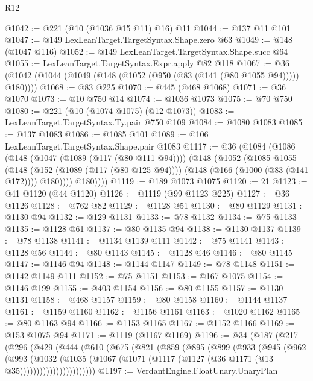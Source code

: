 \begin{lexlean}{R12}
\begin{coremodule}
@1042 := @221 (@10 (@1036 @15 @11) @16) @11
@1044 := @137 @11 @101
@1047 := @149 LexLeanTarget.TargetSyntax.Shape.zero @63
@1049 := @148 (@1047 @116)
@1052 := @149 LexLeanTarget.TargetSyntax.Shape.succ @64
@1055 := LexLeanTarget.TargetSyntax.Expr.apply @82 @118
@1067 := @36 (@1042 (@1044 (@1049 (@148 (@1052 (@950 (@83 (@141 (@80 @1055 @94))))) @180))))
@1068 := @83 @225
@1070 := @445 (@468 @1068)
@1071 := @36 @1070
@1073 := @10 @750 @14
@1074 := @1036 @1073
@1075 := @70 @750
@1080 := @221 (@10 (@1074 @1075) (@12 @1073))
@1083 := LexLeanTarget.TargetSyntax.Ty.pair @750 @109
@1084 := @1080 @1083
@1085 := @137 @1083
@1086 := @1085 @101
@1089 := @106 LexLeanTarget.TargetSyntax.Shape.pair @1083
@1117 := @36
    (@1084
      (@1086
        (@148
          (@1047 (@1089 (@117 (@80 @111 @94))))
          (@148
            (@1052
              (@1085
                @1055
                (@148
                  (@152 (@1089 (@117 (@80 @125 @94))))
                  (@148 (@166 (@1000 (@83 (@141 @172)))) @180))))
            @180))))
@1119 := @189 @1073 @1075
@1120 := 21
@1123 := @41 @1120 (@44 @1120)
@1126 := @1119 (@99 @1123 @225)
@1127 := @36 @1126
@1128 := @762 @82
@1129 := @1128 @51
@1130 := @80 @1129
@1131 := @1130 @94
@1132 := @129 @1131
@1133 := @78 @1132
@1134 := @75 @1133
@1135 := @1128 @61
@1137 := @80 @1135 @94
@1138 := @1130 @1137
@1139 := @78 @1138
@1141 := @1134 @1139 @111
@1142 := @75 @1141
@1143 := @1128 @56
@1144 := @80 @1143
@1145 := @1128 @46
@1146 := @80 @1145
@1147 := @1146 @94
@1148 := @1144 @1147
@1149 := @78 @1148
@1151 := @1142 @1149 @111
@1152 := @75 @1151
@1153 := @167 @1075
@1154 := @1146 @199
@1155 := @403 @1154
@1156 := @80 @1155
@1157 := @1130 @1131
@1158 := @468 @1157
@1159 := @80 @1158
@1160 := @1144 @1137
@1161 := @1159 @1160
@1162 := @1156 @1161
@1163 := @1020 @1162
@1165 := @80 @1163 @94
@1166 := @1153 @1165
@1167 := @1152 @1166
@1169 := @153 @1075 @94
@1171 := @1119 (@1167 @1169)
@1196 := @34
    (@187
      (@217
        (@296
          (@429
            (@444
              (@610
                (@675
                  (@821
                    (@859
                      (@895
                        (@899
                          (@933
                            (@945
                              (@962
                                (@993
                                  (@1032
                                    (@1035
                                      (@1067
                                        (@1071
                                          (@1117 (@1127 (@36 @1171 (@13 @35)))))))))))))))))))))))
@1197 := VerdantEngine.FloatUnary.UnaryPlan

\end{coremodule}
\end{lexlean}
